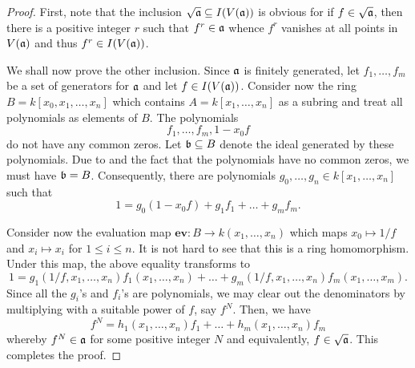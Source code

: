 \begin{proof}
    First, note that the inclusion $\sqrt{\mathfrak a}\subseteq I(V(\mathfrak a))$ is obvious for if $f\in\sqrt{\mathfrak a}$, then there is a positive integer $r$ such that $f^r\in\mathfrak a$ whence $f^r$ vanishes at all points in $V(\mathfrak a)$ and thus $f^r\in I(V(\mathfrak a))$.

    We shall now prove the other inclusion. Since $\mathfrak a$ is finitely generated, let $f_1,\dots,f_m$ be a set of generators for $\mathfrak a$ and let $f\in I(V(\mathfrak a))$. Consider now the ring $B = k[x_0,x_1,\dots,x_n]$ which contains $A = k[x_1,\dots,x_n]$ as a subring and treat all polynomials as elements of $B$. The polynomials
    \begin{equation*}
        f_1,\dots,f_m, 1 - x_0f
    \end{equation*}
    do not have any common zeros. Let $\mathfrak b\subseteq B$ denote the ideal generated by these polynomials. Due to  and the fact that the polynomials have no common zeros, we must have $\mathfrak b = B$. Consequently, there are polynomials $g_0,\dots,g_n\in k[x_1,\dots,x_n]$ such that 
    \begin{equation*}
        1 = g_0(1 - x_0f) + g_1f_1 + \dots + g_mf_m.
    \end{equation*}

    Consider now the evaluation map $\mathbf{ev}: B\to k(x_1,\dots,x_n)$ which maps $x_0\mapsto 1/f$ and $x_i\mapsto x_i$ for $1\le i\le n$. It is not hard to see that this is a ring homomorphism. Under this map, the above equality transforms to 
    \begin{equation*}
        1 = g_1(1/f,x_1,\dots,x_n)f_1(x_1,\dots,x_n) + \dots + g_m(1/f,x_1,\dots,x_n)f_m(x_1,\dots,x_m).
    \end{equation*}
    Since all the $g_i$'s and $f_i$'s are polynomials, we may clear out the denominators by multiplying with a suitable power of $f$, say $f^N$. Then, we have 
    \begin{equation*}
        f^N = h_1(x_1,\dots,x_n)f_1 + \dots + h_m(x_1,\dots,x_n)f_m
    \end{equation*}
    whereby $f^N\in\mathfrak a$ for some positive integer $N$ and equivalently, $f\in\sqrt{\mathfrak a}$. This completes the proof.
\end{proof}